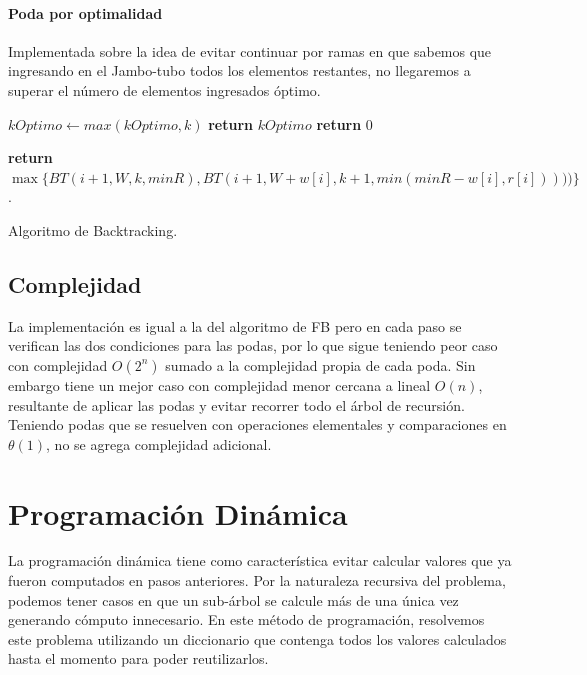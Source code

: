 \documentclass[10pt,a4paper]{article}
\begin{document}
\paragraph{Poda por optimalidad}
Implementada sobre la idea de evitar continuar por ramas en que sabemos que ingresando en el Jambo-tubo todos los elementos restantes, no llegaremos a superar el número de elementos ingresados óptimo.

\begin{algorithm}
	\begin{algorithmic}[1]

				\State $kOptimo \leftarrow max(kOptimo, k)$
				\State \textbf{return} $kOptimo$
			\Else	
				\State \textbf{return} $0$
			\EndIf
		\EndIf
		
		\EndIf
		
		\EndIf
		
		\State \textbf{return} $\max \{ BT(i+1, W, k, minR), BT(i+1, W+w[i], k+1, min(minR - w[i], r[i])))) \}$.
		
		\EndFunction
	\end{algorithmic}
	\caption{Algoritmo de Backtracking.}
	\label{alg:backtracking}
\end{algorithm}

\subsection{Complejidad}
La implementación es igual a la del algoritmo de FB pero en cada paso se verifican las dos condiciones para las podas, por lo que sigue teniendo peor caso con complejidad $O(2^n)$ sumado a la complejidad propia de cada poda. Sin embargo tiene un mejor caso con complejidad menor cercana a lineal $O(n)$, resultante de aplicar las podas y evitar recorrer todo el árbol de recursión. Teniendo podas que se resuelven con operaciones elementales y comparaciones en $\theta(1)$, no se agrega complejidad adicional.

\section{Programación Dinámica} \label{sec:dp}
La programación dinámica tiene como característica evitar calcular valores que ya fueron computados en pasos anteriores. Por la naturaleza recursiva del problema, podemos tener casos en que un sub-árbol se calcule más de una única vez generando cómputo innecesario. En este método de programación, resolvemos este problema utilizando un diccionario que contenga todos los valores calculados hasta el momento para poder reutilizarlos.
\end{document}
